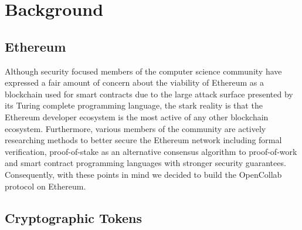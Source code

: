 \section{Background}
\label{sec:background}

\subsection{Ethereum}

Although security focused members of the computer science community have
expressed a fair amount of concern about the viability of Ethereum as a
blockchain used for smart contracts due to the large attack surface presented by
its Turing complete programming language, the stark reality is that the Ethereum
developer ecosystem is the most active of any other blockchain ecosystem.
Furthermore, various members of the community are actively researching methods
to better secure the Ethereum network including formal verification,
proof-of-stake as an alternative consensus algorithm to proof-of-work and smart
contract programming languages with stronger security guarantees.
Consequently, with these points in mind we decided to build the OpenCollab protocol on Ethereum.

\subsection{Cryptographic Tokens}

